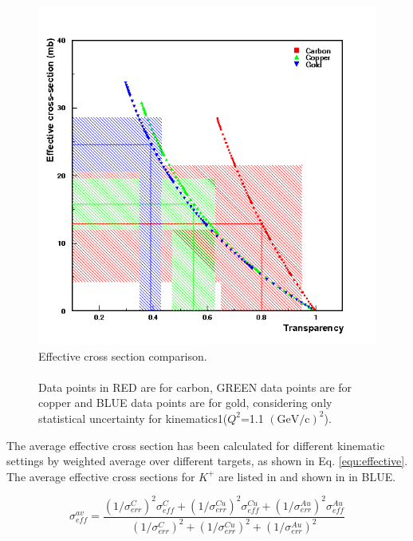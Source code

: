 \begin{figure}[!tbp]
  \centering
  \includegraphics[width=0.8\columnwidth]{eff_t_all}
  \caption[Effective cross section comparison.]{\label{fig:eff_t_all}Effective cross section comparison.\\\\ Data points in RED are for carbon, GREEN data points are for copper and BLUE data points are for gold, considering only statistical uncertainty for kinematics1($Q^2$=1.1 $(\mathrm{GeV/c})^2$).}
\end{figure}

The average effective cross section has been calculated for different kinematic settings by weighted average over different targets, as shown in Eq. \ref{equ:effective}. The average effective cross sections for $K^+$ are listed in  and shown in  in BLUE.

\begin{equation} \label{equ:effective}
\sigma_{eff}^{av} = 
\frac{\left(1/\sigma_{err}^{C}\right)^{2}\sigma_{eff}^{C}+ \left(1/\sigma_{err}^{Cu}\right)^2\sigma_{eff}^{Cu}+
\left(1/\sigma_{err}^{Au}\right)^2\sigma_{eff}^{Au}}
{\left(1/\sigma_{err}^{C}\right)^2+ \left(1/\sigma_{err}^{Cu}\right)^2+\left(1/\sigma_{err}^{Au}\right)^2}
\end{equation}


